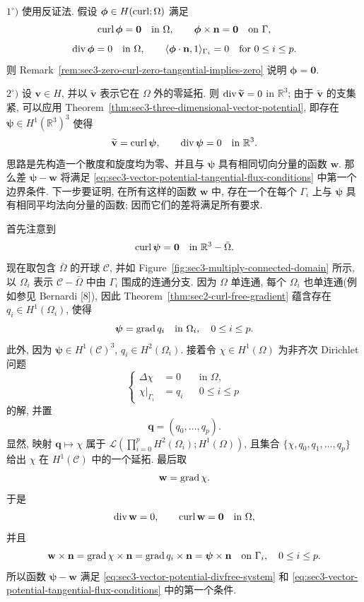 \begin{Proof}
$1^\circ)$ 使用反证法. 假设 $\boldsymbol\phi\in H(\operatorname{curl};\Omega)$ 满足
\[
\operatorname{curl}\boldsymbol\phi=\mathbf0\quad\text{in }\Omega,
\qquad
\boldsymbol\phi\times\mathbf n=\mathbf0\quad\text{on }\Gamma,
\]
\[
\operatorname{div}\boldsymbol\phi=0\quad\text{in }\Omega,
\qquad
\langle\boldsymbol\phi\cdot\mathbf n,1\rangle_{\Gamma_i}=0
\quad\text{for }0\le i\le p.
\]
则 Remark~\ref{rem:sec3-zero-curl-zero-tangential-implies-zero} 说明
$\boldsymbol\phi=\mathbf0$.

$2^\circ)$ 设 $\mathbf v\in H$, 并以 $\widetilde{\mathbf v}$ 表示它在
$\Omega$ 外的零延拓. 则 $\operatorname{div}\widetilde{\mathbf v}=0$ in $\mathbb R^3$;
由于 $\widetilde{\mathbf v}$ 的支集紧, 可以应用
Theorem~\ref{thm:sec3-three-dimensional-vector-potential}, 即存在
$\boldsymbol\psi\in H^1(\mathbb R^3)^3$ 使得
\[
\widetilde{\mathbf v}=\operatorname{curl}\boldsymbol\psi,
\qquad
\operatorname{div}\boldsymbol\psi=0\quad\text{in }\mathbb R^3.
\]
思路是先构造一个散度和旋度均为零、并且与 $\boldsymbol\psi$ 具有相同切向分量的函数
$\mathbf w$. 那么差 $\boldsymbol\psi-\mathbf w$ 将满足
\eqref{eq:sec3-vector-potential-tangential-flux-conditions} 中第一个边界条件.
下一步要证明, 在所有这样的函数 $\mathbf w$ 中, 存在一个在每个 $\Gamma_i$ 上与
$\boldsymbol\psi$ 具有相同平均法向分量的函数; 因而它们的差将满足所有要求.

首先注意到
\[
\operatorname{curl}\boldsymbol\psi=\mathbf0\quad\text{in }\mathbb R^3-\bar\Omega.
\]
现在取包含 $\bar\Omega$ 的开球 $\mathcal C$, 并如 Figure~\ref{fig:sec3-multiply-connected-domain}
所示, 以 $\Omega_i$ 表示 $\mathcal C-\bar\Omega$ 中由 $\Gamma_i$ 围成的连通分支.
因为 $\Omega$ 单连通, 每个 $\Omega_i$ 也单连通(例如参见 Bernardi [8]), 因此
Theorem~\ref{thm:sec2-curl-free-gradient} 蕴含存在
$q_i\in H^1(\Omega_i)$, 使得
\begin{equation}\label{eq:sec3-exterior-potential-gradients}
\boldsymbol\psi=\operatorname{grad} q_i\quad\text{in }\Omega_i,
\quad0\le i\le p.
\end{equation}
此外, 因为 $\boldsymbol\psi\in H^1(\mathcal C)^3$,
$q_i\in H^2(\Omega_i)$. 接着令 $\chi\in H^1(\Omega)$ 为非齐次 Dirichlet 问题
\begin{equation}\label{eq:sec3-harmonic-extension-boundary-data}
\left\{\begin{aligned}
\Delta\chi&=0&&\text{in }\Omega,\\
\chi|_{\Gamma_i}&=q_i&&0\le i\le p
\end{aligned}\right.
\end{equation}
的解, 并置
\[
\mathbf q=(q_0,\ldots,q_p).
\]
显然, 映射 $\mathbf q\mapsto\chi$ 属于
$\mathcal L(\prod_{i=0}^pH^2(\Omega_i);H^1(\Omega))$, 且集合
$\{\chi,q_0,q_1,\ldots,q_p\}$ 给出 $\chi$ 在 $H^1(\mathcal C)$ 中的一个延拓.
最后取
\[
\mathbf w=\operatorname{grad}\chi.
\]
于是
\[
\operatorname{div}\mathbf w=0,
\qquad
\operatorname{curl}\mathbf w=\mathbf0\quad\text{in }\Omega,
\]
并且
\[
\mathbf w\times\mathbf n=\operatorname{grad}\chi\times\mathbf n
=\operatorname{grad} q_i\times\mathbf n=\boldsymbol\psi\times\mathbf n
\quad\text{on }\Gamma_i,
\quad0\le i\le p.
\]
所以函数 $\boldsymbol\psi-\mathbf w$ 满足
\eqref{eq:sec3-vector-potential-divfree-system} 和
\eqref{eq:sec3-vector-potential-tangential-flux-conditions} 中的第一个条件.


\end{Proof}
